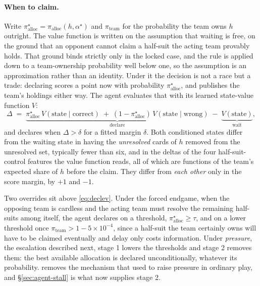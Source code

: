 \paragraph{When to claim.} Write $\pi_{\mathrm{alloc}}^\star = \pi_{\mathrm{alloc}}(h,\alpha^\star)$
and $\pi_{\mathrm{team}}$ for the probability the team owns $h$ outright. The value function is written on the assumption that waiting is free, on the ground that an opponent
cannot claim a half-suit the acting team provably holds. That ground binds strictly only in the
locked case, and the rule is applied down to a team-ownership probability well below one, so the
assumption is an approximation rather than an identity. Under it the decision is not a race but a
trade: declaring scores a point now with probability $\pi_{\mathrm{alloc}}^\star$, and
publishes the team's holdings either way. The agent evaluates that with its learned state-value
function $V$:
\begin{equation}
  \Delta \;=\; \underbrace{\pi_{\mathrm{alloc}}^\star\, V(\text{state} \mid \text{correct})
  \;+\; (1-\pi_{\mathrm{alloc}}^\star)\, V(\text{state} \mid \text{wrong})}_{\text{declare}}
  \;-\; \underbrace{V(\text{state})}_{\text{wait}},
  \label{eq:declev}
\end{equation}
and declares when $\Delta > \delta$ for a fitted margin $\delta$. Both conditioned states differ from the waiting state in having the \emph{unresolved} cards of $h$
removed from the unresolved set, typically fewer than six, and in the deltas of the four
half-suit-control features the value function reads, all of which are functions of the team's
expected share of $h$ before the claim. They differ from \emph{each other} only in the score margin,
by $+1$ and $-1$.

Two overrides sit above \eqref{eq:declev}. Under the forced endgame, when the opposing team is
cardless and the acting team must resolve the remaining half-suits among itself, the agent declares
on a threshold, $\pi_{\mathrm{alloc}}^\star \ge \tau$, and on a lower threshold once $\pi_{\mathrm{team}} > 1 - 5\times10^{-4}$, since a half-suit the team certainly owns will have to be
claimed eventually and delay only costs information. Under \emph{pressure}, the escalation described next, stage 1 lowers the thresholds and stage 2
removes them: the best available allocation is declared unconditionally, whatever its probability.
\sestina{} removes the mechanism that used to raise pressure in ordinary play, and
\S\ref{sec:agent-stall} is what now supplies stage 2.

